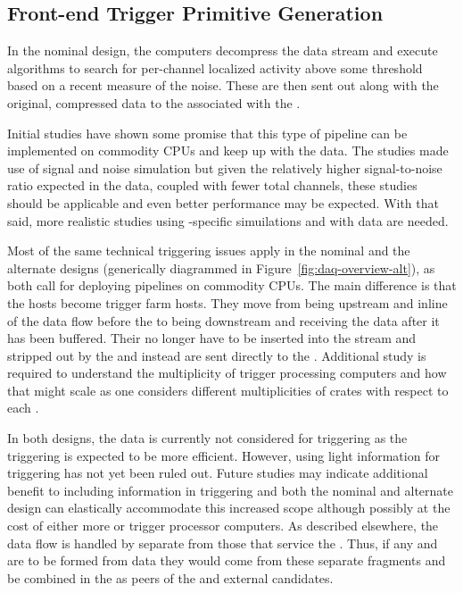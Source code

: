 \subsection{Front-end Trigger Primitive Generation}
\label{sec:fd-daq-fetp}

In the nominal design, the  computers decompress the
 data stream and execute algorithms to search for per-channel
localized activity above some threshold based on a recent measure of
the noise. 
These  are then sent out along with the original,
compressed  data to the  associated with the .

Initial studies have shown some promise that this type of  pipeline can be implemented on commodity CPUs and keep up
with the data. 
The studies made use of  signal and noise simulation but
given the relatively higher signal-to-noise ratio expected in the 
data, coupled with fewer total channels, these studies should
be applicable and even better performance may be expected. 
With that said, more realistic studies using -specific
simuilations and with  data are needed.

Most of the same technical triggering issues apply in the nominal and
the alternate designs (generically diagrammed in
Figure~\ref{fig:daq-overview-alt}), as both call for deploying  pipelines on commodity CPUs. 
The main difference is that the  hosts become trigger farm
hosts. 
They move from being upstream and inline of the data flow before the
 to being downstream and receiving the data after it has
been buffered. 
Their  no longer have to be inserted into the
stream and stripped out by the  and instead are sent
directly to the . 
Additional study is required to understand the multiplicity of trigger
processing computers and how that might scale as one considers
different multiplicities of   crates with respect to each
.

In both designs, the  data is currently not considered for
triggering as the  triggering is expected to be more
efficient. However, using light information for triggering has not yet
been ruled out. 
Future studies may indicate additional benefit to including
 information in triggering and both the nominal and
alternate design can elastically accommodate this increased scope
although possibly at the cost of either more  or trigger
processor computers.
As described elsewhere, the  data flow is handled by
separate  from those that service the . 
Thus, if any  and  are to
be formed from  data they would come from these separate
fragments and be combined in the  as peers of the
 and external candidates.

